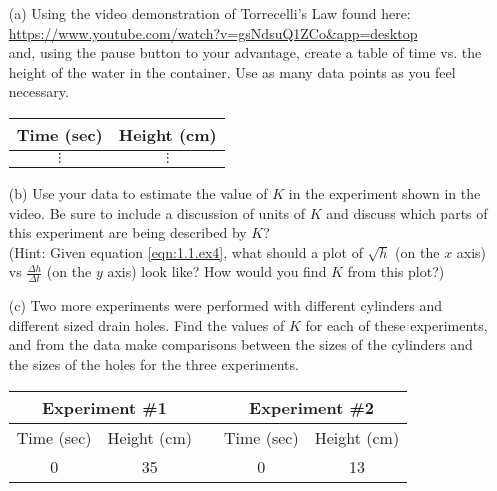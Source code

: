 \begin{problem}
\begin{enumerate}
    \item[(a)] Using the video demonstration of Torrecelli's Law found here: \\
            \href{https://www.youtube.com/watch?v=gsNdsuQ1ZCo&app=desktop}{https://www.youtube.com/watch?v=gsNdsuQ1ZCo\&app=desktop}
            \\ and, using the pause button to your advantage, create a table of time vs.
            the height of the water in the container. Use as many data points as you feel
            necessary.
            \begin{center}
                \begin{tabular}{|c|c|}
                    \hline
                    Time (sec) & Height (cm) \\ \hline \hline
                    $\vdots$ & $\vdots$ \\
                    \hline
                \end{tabular}
            \end{center}
        \item[(b)] Use your data to estimate the value of $K$ in the experiment shown in the
            video. Be sure to include a discussion of units of $K$ and discuss which parts
            of this experiment are being described by $K$? \\ (Hint: Given equation
            \eqref{eqn:1.1.ex4}, what should a plot of $\sqrt{h}$ (on the $x$ axis) vs
            $\frac{\Delta h}{\Delta t}$ (on the $y$ axis) look like? How would you find
            $K$ from this plot?) 
        \item[(c)] Two more experiments were performed with different cylinders and different
            sized drain holes. Find the values of $K$ for each of these experiments, and
            from the data make comparisons between the sizes of the cylinders and the
            sizes of the holes for the three experiments.
            \begin{center}
                \begin{tabular}{|c|c|c|c|c|}
                    \hline
                    \multicolumn{2}{|c|}{Experiment \#1} & \hspace{0.2in} &
                    \multicolumn{2}{|c|}{Experiment \#2} \\ \hline 
                    Time (sec) & Height (cm) & & Time (sec) & Height (cm) \\ \hline \hline
                    0      & 35  & &  0     & 13  \\

\end{tabular}
\end{center}
\end{enumerate}
\end{problem}
